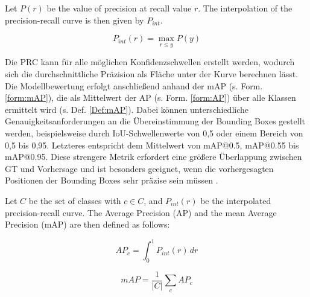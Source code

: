 \begin{definition}
\label{Def:IPRC}
Let $P(r)$ be the value of precision at recall value $r$. 
The interpolation of the precision-recall curve is then given by $P_{int}$.

\begin{equation}
P_{int}(r) = \max_{r \leq y} P(y)
\end{equation}
\end{definition}


Die \acrshort{PRC} kann für alle möglichen Konfidenzschwellen erstellt werden, wodurch sich die durchschnittliche Präzision als Fläche unter der Kurve berechnen lässt. Die Modellbewertung erfolgt anschließend anhand der \acrfull{mAP} (s. Form. \ref{form:mAP}), die als Mittelwert der \acrfull{AP} (s. Form. \ref{form:AP}) über alle Klassen ermittelt wird (s. Def. \ref{Def:mAP})\cite{Rainio2024}. Dabei können unterschiedliche Genauigkeitsanforderungen an die Übereinstimmung der Bounding Boxes gestellt werden, beispielsweise durch IoU-Schwellenwerte von 0,5 oder einem Bereich von 0,5 bis 0,95. Letzteres entspricht dem Mittelwert von \acrshort{mAP}@0.5, \acrshort{mAP}@0.55 bis \acrshort{mAP}@0.95. Diese strengere Metrik erfordert eine größere Überlappung zwischen \acrshort{GT} und Vorhersage und ist besonders geeignet, wenn die vorhergesagten Positionen der Bounding Boxes sehr präzise sein müssen \cite{Rainio2024}.


\begin{definition}
\label{Def:mAP}
Let $C$ be the set of classes with $c \in C$, and $P_{int}(r)$ be the interpolated precision-recall curve. 
The Average Precision (AP) and the mean Average Precision (mAP) are then defined as follows:

\begin{equation}
\label{form:AP}
AP_c = \int_0^1 P_{int}(r)\,dr
\end{equation}

\begin{equation}
\label{form:mAP}
mAP = \frac{1}{|C|} \sum_c AP_c
\end{equation}
\end{definition}

